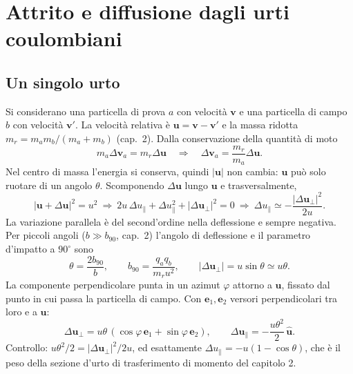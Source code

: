 \section{Attrito e diffusione dagli urti coulombiani}
\subsection{Un singolo urto}
Si considerano una particella di prova $a$ con velocità $\mathbf{v}$ e una particella di campo $b$ con velocità $\mathbf{v}'$. La velocità relativa è $\mathbf{u}=\mathbf{v}-\mathbf{v}'$ e la massa ridotta $m_r=m_am_b/(m_a+m_b)$ (cap.~2). Dalla conservazione della quantità di moto
\begin{equation}
m_a\Delta\mathbf{v}_a=m_r\Delta\mathbf{u}\quad\Rightarrow\quad\Delta\mathbf{v}_a=\frac{m_r}{m_a}\Delta\mathbf{u}.
\end{equation}
Nel centro di massa l'energia si conserva, quindi $|\mathbf{u}|$ non cambia: $\mathbf{u}$ può solo ruotare di un angolo $\theta$. Scomponendo $\Delta\mathbf{u}$ lungo $\mathbf{u}$ e trasversalmente,
\begin{equation}
|\mathbf{u}+\Delta\mathbf{u}|^2=u^2\ \Rightarrow\ 2u\,\Delta u_\parallel+\Delta u_\parallel^2+|\Delta\mathbf{u}_\perp|^2=0\ \Rightarrow\ \Delta u_\parallel\simeq-\frac{|\Delta\mathbf{u}_\perp|^2}{2u}.
\end{equation}
La variazione parallela è del second'ordine nella deflessione e sempre negativa.
Per piccoli angoli ($b\gg b_{90}$, cap.~2) l'angolo di deflessione e il parametro d'impatto a $90^\circ$ sono
\begin{equation}
\theta=\frac{2b_{90}}{b},\qquad b_{90}=\frac{q_aq_b}{m_ru^2},\qquad|\Delta\mathbf{u}_\perp|=u\sin\theta\simeq u\theta .
\end{equation}
La componente perpendicolare punta in un azimut $\varphi$ attorno a $\mathbf{u}$, fissato dal punto in cui passa la particella di campo. Con $\mathbf{e}_1,\mathbf{e}_2$ versori perpendicolari tra loro e a $\mathbf{u}$:
\begin{equation}
\Delta\mathbf{u}_\perp=u\theta\,(\cos\varphi\,\mathbf{e}_1+\sin\varphi\,\mathbf{e}_2),\qquad\Delta\mathbf{u}_\parallel=-\frac{u\theta^2}{2}\,\hat{\mathbf{u}}.
\end{equation}
Controllo: $u\theta^2/2=|\Delta\mathbf{u}_\perp|^2/2u$, ed esattamente $\Delta u_\parallel=-u(1-\cos\theta)$, che è il peso della sezione d'urto di trasferimento di momento del capitolo 2.

